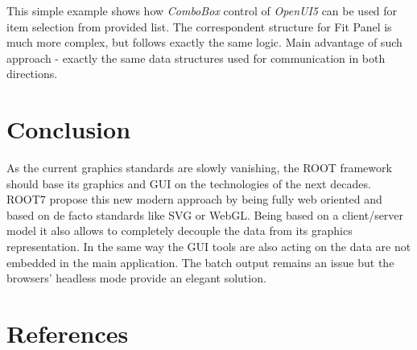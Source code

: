 \documentclass[a4paper]{jpconf}
\begin{document}
This simple example shows how \textit{ComboBox} control of \textit{OpenUI5} can be used for item selection from provided list.
The correspondent structure for Fit Panel is much more complex, but follows exactly the same logic. 
Main advantage of such approach - exactly the same data structures used for communication in both directions.


\section{Conclusion}

As the current graphics standards are slowly vanishing, the ROOT framework should
base its graphics and GUI on the technologies of the next decades. ROOT7 propose
this new modern approach by being fully web oriented and based on de facto standards
like SVG or WebGL. Being based on a client/server model it also allows to completely
decouple the data from its graphics representation. In the same way the GUI tools
are also acting on the data are not embedded in the main application.
The batch output remains an issue but the browsers' headless mode provide an elegant solution.


\section{References}

\end{document}

